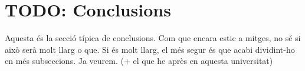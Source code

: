 
\section{TODO: Conclusions}

Aquesta és la secció típica de conclusions. Com que encara estic a mitges, no
sé si això serà molt llarg o que. Si és molt llarg, el més segur és que acabi
dividint-ho en més subseccions. Ja veurem. (+ el que he après en aquesta
universitat)
